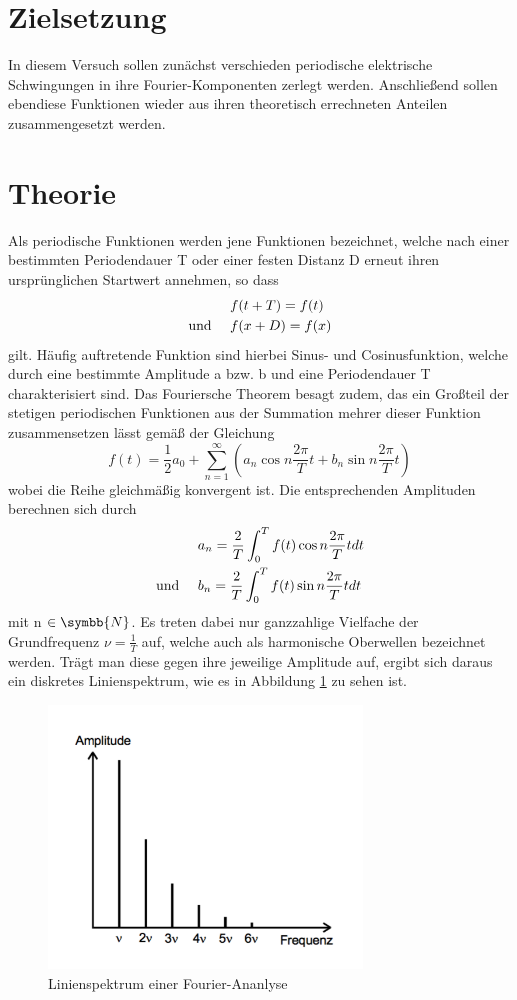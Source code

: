 
\section{Zielsetzung}
In diesem Versuch sollen zunächst verschieden periodische elektrische
Schwingungen in ihre Fourier-Komponenten zerlegt werden. Anschließend sollen
ebendiese Funktionen wieder aus ihren theoretisch errechneten Anteilen
zusammengesetzt werden.

\section{Theorie}
Als periodische Funktionen werden jene Funktionen bezeichnet, welche nach
einer bestimmten Periodendauer T oder einer festen Distanz D erneut ihren
ursprünglichen Startwert annehmen, so dass
\begin{align}
  & f(t+T)=f(t) \\
  \text{und \quad}      & f(x+D)=f(x)
  \label{eqn:period}
\end{align}
gilt. Häufig auftretende Funktion sind hierbei Sinus- und Cosinusfunktion,
welche durch eine bestimmte Amplitude a bzw. b und eine Periodendauer T
charakterisiert sind.
Das Fouriersche Theorem besagt zudem, das ein Großteil der stetigen periodischen
Funktionen aus der Summation mehrer dieser Funktion zusammensetzen lässt gemäß
der Gleichung
\begin{equation}
   f(t)= \frac{1}{2}a_0 + \sum_{n=1}^\infty (a_n \cos n \frac{2 \pi}{T}t
   + b_n \sin n \frac{2 \pi}{T}t)
\end{equation}
wobei die Reihe gleichmäßig konvergent ist. Die entsprechenden Amplituden
berechnen sich durch
\begin{align}
  & a_n = \frac{2}{T} \int_0^T f(t) \cos n \frac{2 \pi}{T}t dt \\
  \text{und \quad}     & b_n = \frac{2}{T} \int_0^T f(t) \sin n \frac{2 \pi}
  {T}t dt
\end{align}
mit n $\in \symbb{N} $. Es treten dabei nur ganzzahlige Vielfache der
Grundfrequenz $\nu = \frac{1}{T} $ auf, welche auch als harmonische Oberwellen
bezeichnet werden. Trägt man diese gegen ihre jeweilige Amplitude auf, ergibt
sich daraus ein diskretes Linienspektrum, wie es in Abbildung
\ref{fig:spektrum} zu sehen ist.
\begin{figure}[h]
  \centering
  \includegraphics[height=7cm]{Spektrum.png}
  \caption{Linienspektrum einer Fourier-Ananlyse \cite{skript}}
  \label{fig:spektrum}
\end{figure}
